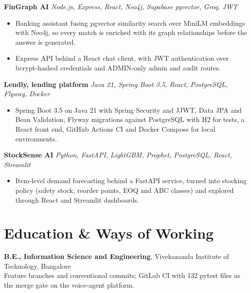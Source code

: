 \documentclass[10pt,a4paper]{article}
\begin{document}
\vspace{1pt}
\textbf{FinGraph AI} \textit{Node.js, Express, React, Neo4j, Supabase pgvector, Groq, JWT}
\begin{itemize}
  \item Banking assistant fusing pgvector similarity search over MiniLM embeddings with Neo4j, so
        every match is enriched with its graph relationships before the answer is generated.
  \item Express API behind a React chat client, with JWT authentication over bcrypt-hashed
        credentials and ADMIN-only admin and audit routes.
\end{itemize}

\vspace{1pt}
\textbf{Lendly, lending platform} \textit{Java 21, Spring Boot 3.5, React, PostgreSQL, Flyway, Docker}
\begin{itemize}
  \item Spring Boot 3.5 on Java 21 with Spring Security and JJWT, Data JPA and Bean Validation, Flyway
        migrations against PostgreSQL with H2 for tests, a React front end, GitHub Actions CI and
        Docker Compose for local environments.
\end{itemize}

\vspace{1pt}
\textbf{StockSense AI} \textit{Python, FastAPI, LightGBM, Prophet, PostgreSQL, React, Streamlit}
\begin{itemize}
  \item Item-level demand forecasting behind a FastAPI service, turned into stocking policy (safety
        stock, reorder points, EOQ and ABC classes) and explored through React and Streamlit
        dashboards.
\end{itemize}

\section{Education \& Ways of Working}
\textbf{B.E., Information Science and Engineering}, Vivekananda Institute of Technology, Bangalore\\
Feature branches and conventional commits; GitLab CI with 132 pytest files as the merge gate on the
voice-agent platform.
\end{document}
